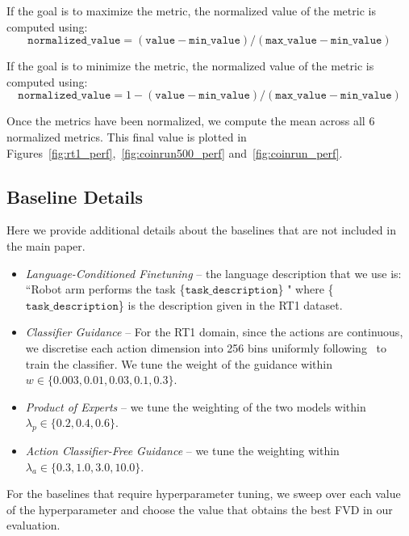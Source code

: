 If the goal is to maximize the metric, the normalized value of the metric is computed using:
\begin{equation}
    \mathtt{normalized\_value} = \mathtt{(value - min\_value) / (max\_value  - min\_value)}
\end{equation}

If the goal is to minimize the metric, the normalized value of the metric is computed using:
\begin{equation}
    \mathtt{normalized\_value} = 1 - \mathtt{(value - min\_value) / (max\_value  - min\_value)}
\end{equation}

Once the metrics have been normalized, we compute the mean across all 6 normalized metrics. This final value is plotted in Figures~\ref{fig:rt1_perf},~\ref{fig:coinrun500_perf} and~\ref{fig:coinrun_perf}.

\subsection{Baseline Details}
\label{app:baselines}
Here we provide additional details about the baselines that are not included in the main paper.
\begin{itemize}[leftmargin=*, topsep=0pt]
    \item \textit{Language-Conditioned Finetuning} -- the language description that we use is: ``Robot arm performs the task \{$\mathtt{task\_description}$\} " where \{$\mathtt{task\_description}$\} is the description given in the RT1 dataset.
    \item \textit{Classifier Guidance} \citep{dhariwal2021diffusion} -- For the RT1 domain, since the actions are continuous, we discretise each action dimension into 256 bins  uniformly following~\cite{padalkar2023open} to train the classifier. We tune the weight of the guidance within $w \in \{0.003, 0.01, 0.03, 0.1, 0.3 \}$. 
    \item \textit{Product of Experts} -- we tune the weighting of the two models within $\lambda_p \in \{0.2, 0.4, 0.6 \}$. 
    \item \textit{Action Classifier-Free Guidance} -- we tune the weighting within $\lambda_a \in \{0.3, 1.0, 3.0, 10.0 \}$. 
\end{itemize}

For the baselines that require hyperparameter tuning, we sweep over each value of the hyperparameter and choose the value that obtains the best FVD in our evaluation.

